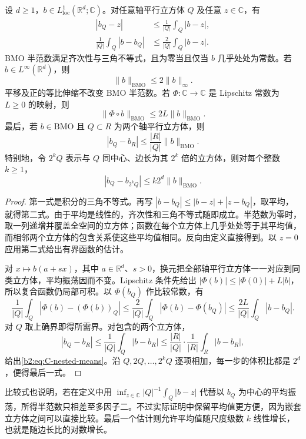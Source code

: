 \begin{proposition}[平均振荡的基本比较]\label{b2:prop:C-bmo-basic}
设 \(d\geq1\)，\(b\in L^1_{\mathrm{loc}}(\mathbb R^d;\mathbb C)\)。对任意轴平行立方体 \(Q\) 及任意 \(z\in\mathbb C\)，有
\begin{equation}\label{b2:eq:C-oscillation-constant}
 \begin{aligned}
 |b_Q-z|&\leq\frac1{|Q|}\int_Q|b-z|,\\
 \frac1{|Q|}\int_Q|b-b_Q|
 &\leq\frac2{|Q|}\int_Q|b-z|.
 \end{aligned}
\end{equation}
BMO 半范数满足齐次性与三角不等式，且为零当且仅当 \(b\) 几乎处处为常数。若 \(b\in L^\infty(\mathbb R^d)\)，则
\[
 \|b\|_{\mathrm{BMO}}\leq2\|b\|_\infty.
\]
平移及正的等比伸缩不改变 BMO 半范数。若 \(\Phi:\mathbb C\to\mathbb C\) 是 Lipschitz 常数为 \(L\geq0\) 的映射，则
\[
 \|\Phi\circ b\|_{\mathrm{BMO}}\leq2L\|b\|_{\mathrm{BMO}}.
\]
最后，若 \(b\in\mathrm{BMO}\) 且 \(Q\subset R\) 为两个轴平行立方体，则
\begin{equation}\label{b2:eq:C-nested-means}
 |b_Q-b_R|\leq\frac{|R|}{|Q|}\|b\|_{\mathrm{BMO}}.
\end{equation}
特别地，令 \(2^kQ\) 表示与 \(Q\) 同中心、边长为其 \(2^k\) 倍的立方体，则对每个整数 \(k\geq1\)，
\[
 |b_Q-b_{2^kQ}|\leq k2^d\|b\|_{\mathrm{BMO}}.
\]
\end{proposition}
\begin{proof}
第一式是积分的三角不等式。再写
\(|b-b_Q|\leq|b-z|+|z-b_Q|\)，取平均，就得第二式。由于平均是线性的，齐次性和三角不等式随即成立。半范数为零时，取一列递增并覆盖全空间的立方体；函数在每个立方体上几乎处处等于其平均值，而相邻两个立方体的包含关系使这些平均值相同。反向由定义直接得到。以 \(z=0\) 应用第二式给出有界函数的估计。

对 \(x\mapsto b(a+s x)\)，其中 \(a\in\mathbb R^d\)、\(s>0\)，换元把全部轴平行立方体一一对应到同类立方体，平均振荡因而不变。Lipschitz 条件先给出
\(|\Phi(b)|\leq|\Phi(0)|+L|b|\)，所以复合函数仍局部可积。以 \(\Phi(b_Q)\) 作比较常数，有
\[
 \frac1{|Q|}\int_Q|\Phi(b)-(\Phi(b))_Q|
 \leq\frac2{|Q|}\int_Q|\Phi(b)-\Phi(b_Q)|
 \leq\frac{2L}{|Q|}\int_Q|b-b_Q|.
\]
对 \(Q\) 取上确界即得所需界。对包含的两个立方体，
\[
 |b_Q-b_R|
 \leq\frac1{|Q|}\int_Q|b-b_R|
 \leq\frac{|R|}{|Q|}\cdot
       \frac1{|R|}\int_R|b-b_R|,
\]
给出\eqref{b2:eq:C-nested-means}。沿 \(Q,2Q,\ldots,2^kQ\) 逐项相加，每一步的体积比都是 \(2^d\)，便得最后一式。
\end{proof}
比较式也说明，若在定义中用 \(\inf_{z\in\mathbb C}|Q|^{-1}\int_Q|b-z|\) 代替以 \(b_Q\) 为中心的平均振荡，所得半范数只相差至多因子二。不过实际证明中保留平均值更方便，因为嵌套立方体之间可以直接比较。最后一个估计则允许平均值随尺度级数 \(k\) 线性增长，也就是随边长比的对数增长。

